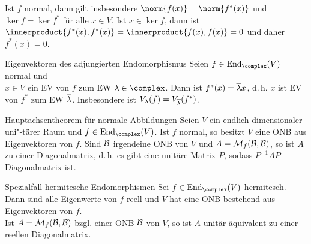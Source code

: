 \begin{Kor}
    Ist $f$ normal, dann gilt insbesondere $\norm{f(x)} = \norm{f^\ast(x)}$
    und $\ker f = \ker f^\ast$ für alle $x \in V$.
    Ist $x \in \ker f$, dann ist $\innerproduct{f^\ast(x), f^\ast(x)} =
    \innerproduct{f(x), f(x)} = 0$ und daher $f^\ast(x) = 0$.
\end{Kor}

\begin{Satz}{Eigenvektoren des adjungierten Endomorphismus}
    Seien $f \in \End_\complex(V)$ normal und \\
    $x \in V$ ein EV von $f$ zum EW $\lambda \in \complex$.
    Dann ist $f^\ast(x) = \overline{\lambda}x$, d.\,h. $x$ ist EV von $f^\ast$ zum
    EW $\overline{\lambda}$.
    Insbesondere ist $V_\lambda(f) = V_{\overline{\lambda}}(f^\ast)$.
\end{Satz}

\begin{Satz}{Hauptachsentheorem für normale Abbildungen}
    Seien $V$ ein endlich-dimensionaler uni"-tärer Raum und
    $f \in \End_\complex(V)$.
    Ist $f$ normal, so besitzt $V$ eine ONB aus Eigenvektoren von $f$.
    Sind $\mathcal{B}$ irgendeine ONB von $V$ und $A = \mathcal{M}_{f}(\mathcal{B},\mathcal{B})$, so
    ist $A$  zu einer Diagonalmatrix,
    d.\,h. es gibt eine
    unitäre Matrix $P$, sodass $P^{-1} A P$ Diagonalmatrix ist.
\end{Satz}

\begin{Satz}{Spezialfall hermitesche Endomorphismen}
    Sei $f \in \End_\complex(V)$ hermitesch.
    Dann sind alle Eigenwerte von $f$ reell und $V$ hat eine ONB bestehend
    aus Eigenvektoren von $f$. \\
    Ist $A = \mathcal{M}_{f}(\mathcal{B},\mathcal{B})$ bzgl. einer ONB $\mathcal{B}$ von $V$, so ist
    $A$ unitär-äquivalent zu einer reellen Diagonalmatrix.
\end{Satz}

\pagebreak
